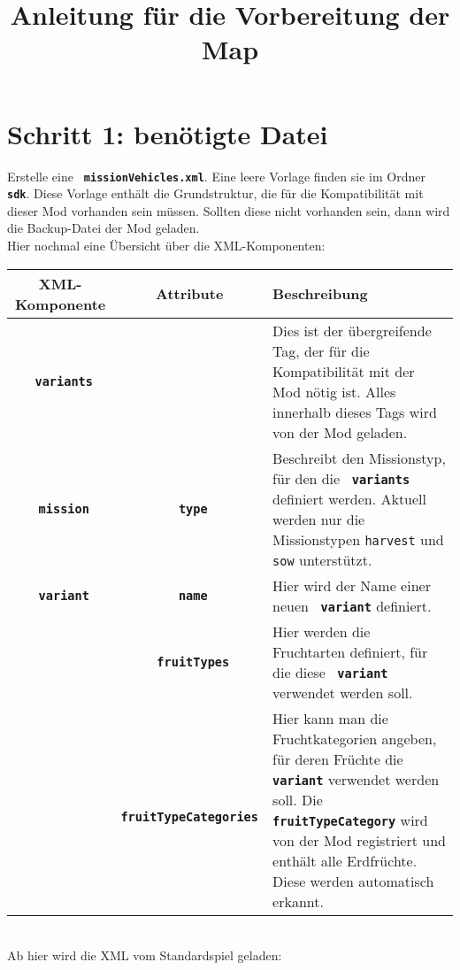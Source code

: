 \documentclass[a4paper]{scrartcl}
\title{Anleitung für die Vorbereitung der Map}
\date{}
\newcommand{\XML}[1]{\texttt{\textbf{\color{pblue} #1}}}
\newcommand{\Attr}[1]{\texttt{\textbf{\color{pgreen} #1}}}
\newcommand{\Datei}[1]{\texttt{\textbf{\color{datei} #1}}}
\begin{document}
	\maketitle
	\vspace{-10mm}
	\section*{Schritt 1: benötigte Datei}
		Erstelle eine \Datei{missionVehicles.xml}. Eine leere Vorlage finden sie im Ordner \Datei{sdk}. Diese Vorlage enthält die Grundstruktur, die für die Kompatibilität mit dieser Mod vorhanden sein müssen. Sollten diese nicht vorhanden sein, dann wird die Backup-Datei der Mod geladen.\\
		Hier nochmal eine Übersicht über die XML-Komponenten:\\
		\begin{tabular}{c|c|p{7cm}}
			\textbf{XML-Komponente} & \textbf{Attribute} & \textbf{Beschreibung}\\
			\hline
			\XML{variants} & & Dies ist der übergreifende Tag, der für die Kompatibilität mit der Mod nötig ist. Alles innerhalb dieses Tags wird von der Mod geladen.\\
			\hline
			\XML{mission} & \Attr{type} & Beschreibt den Missionstyp, für den die \XML{variants} definiert werden. Aktuell werden nur die Missionstypen \texttt{harvest} und \texttt{sow} unterstützt.\\
			\hline
			\XML{variant} & \Attr{name} & Hier wird der Name einer neuen \XML{variant} definiert.\\
			\hdashline
			& \Attr{fruitTypes} & Hier werden die Fruchtarten definiert, für die diese \XML{variant} verwendet werden soll.\\
			\hdashline
			& \Attr{fruitTypeCategories} & Hier kann man die Fruchtkategorien angeben, für deren Früchte die \XML{variant} verwendet werden soll.
			Die \Attr{fruitTypeCategory} \text{'EARTHFRUITS'} wird von der Mod registriert und enthält alle Erdfrüchte.\newline
			Diese werden automatisch erkannt.\\
		\end{tabular}\\
		\newpage
		Ab hier wird die XML vom Standardspiel geladen:\\
\end{document}
